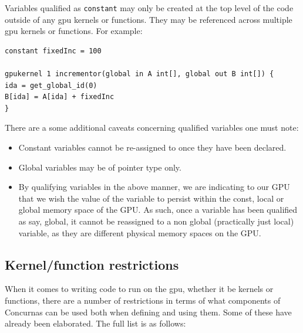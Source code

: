 \documentclass[conc-doc]{subfiles}
\begin{document}
Variables qualified as \lstinline{constant} may only be created at the top level of the code outside of any gpu kernels or functions. They may be referenced across multiple gpu kernels or functions. For example:

\begin{lstlisting}
constant fixedInc = 100

gpukernel 1 incrementor(global in A int[], global out B int[]) {
ida = get_global_id(0) 
B[ida] = A[ida] + fixedInc
}
\end{lstlisting}

There are a some additional caveats concerning qualified variables one must note:

\begin{itemize}
	\item Constant variables cannot be re-assigned to once they have been declared.
	\item Global variables may be of pointer type only.
	\item By qualifying variables in the above manner, we are indicating to our GPU that we wish the value of the variable to persist within the const, local or global memory space of the GPU. As such, once a variable has been qualified as say, global, it cannot be reassigned to a non global (practically just local) variable, as they are different physical memory spaces on the GPU.
\end{itemize}

\subsection{Kernel/function restrictions}
When it comes to writing code to run on the gpu, whether it be kernels or functions, there are a number of restrictions in terms of what components of Concurnas can be used both when defining and using them. Some of these have already been elaborated. The full list is as follows:
\end{document}

